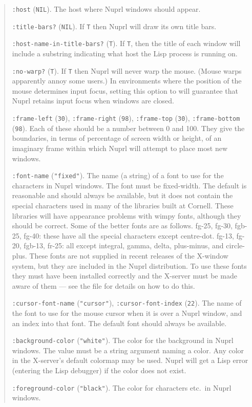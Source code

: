\begin{quote}
{\tt{}:host} ({\tt{}NIL}).  The host where Nuprl windows should appear.  

{\tt{}:title-bars?} ({\tt{}NIL}).  If {\tt{}T}
then Nuprl will draw its own title bars.

{\tt{}:host-name-in-title-bars?} ({\tt{}T}).  
If {\tt{}T}, then the title of each window will
include a substring indicating what host the Lisp process is running on.

{\tt{}:no-warp?} ({\tt{}T}).  If {\tt{}T} then Nuprl will never
warp the mouse.  (Mouse
warps apparently annoy some users.)  In environments where the position of
the mouse determines input focus, setting this option to  will
guarantee that Nuprl retains input focus when windows are closed.

{\tt{}:frame-left} ({\tt{}30}), {\tt{}:frame-right} ({\tt{}98}), 
{\tt{}:frame-top} ({\tt{}30}), {\tt{}:frame-bottom}
({\tt{}98}).  Each of these should be a number between 0 and 100.  They give
the boundaries, in terms of percentage of screen width or height, of an
imaginary frame within which Nuprl will attempt to place most new windows.

{\tt{}:font-name} ({\tt{}"fixed"}).  The name (a string) of a font to use
for the characters in Nuprl windows.  The font must be fixed-width.  The
default is reasonable and should always be available, but it does not
contain the special characters used in many of the libraries built at
Cornell.  These libraries will have appearance problems with wimpy fonts,
although they should be correct.  Some of the better fonts are as follows.
fg-25, fg-30, fgb-25, fg-40: these have all the special characters except
centre-dot.  fg-13, fg-20, fgb-13, fr-25: all except integral, gamma,
delta, plus-minus, and circle-plus.  These fonts are not supplied in recent
releases of the X-window system, but they are included in the Nuprl
distribution.  To use these fonts they must have been installed correctly
and the X-server must be made aware of them --- see the file
 for details on how to do this.

{\tt{}:cursor-font-name} ({\tt{}"cursor"}), {\tt{}:cursor-font-index}
({\tt{}22}).  The name of the font to use for the mouse cursor when it is
over a Nuprl window, and an index into that font.  The default font should
always be available.

{\tt{}:background-color} ({\tt{}"white"}).  The color for the
background in Nuprl windows.  The value must be a string argument
naming a color.  Any color in the X-server's default colormap may be
used.  Nuprl will get a Lisp error (entering the Lisp debugger) if the
color does not exist.

{\tt{}:foreground-color} ({\tt{}"black"}).  The color for characters 
etc.\ in Nuprl windows.

  
\end{quote}


